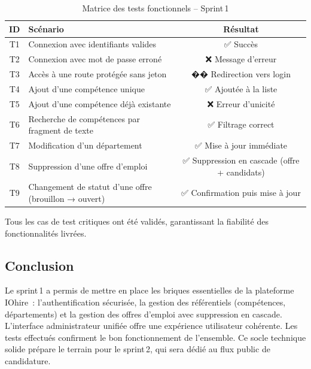 \documentclass[12pt,a4paper,oneside]{report}
\begin{document}
\begin{itemize}
\begin{table}[H]
\centering
\caption{Matrice des tests fonctionnels – Sprint 1}
\label{tab:tests-sprint1}
\begin{tabular}{|c|p{8cm}|c|}
\hline
\textbf{ID} & \textbf{Scénario} & \textbf{Résultat} \\ \hline
T1 & Connexion avec identifiants valides & ✅ Succès \\ \hline
T2 & Connexion avec mot de passe erroné & ❌ Message d’erreur \\ \hline
T3 & Accès à une route protégée sans jeton & �� Redirection vers login \\ \hline
T4 & Ajout d’une compétence unique & ✅ Ajoutée à la liste \\ \hline
T5 & Ajout d’une compétence déjà existante & ❌ Erreur d’unicité \\ \hline
T6 & Recherche de compétences par fragment de texte & ✅ Filtrage correct \\ \hline
T7 & Modification d’un département & ✅ Mise à jour immédiate \\ \hline
T8 & Suppression d’une offre d’emploi & ✅ Suppression en cascade (offre + candidats) \\ \hline
T9 & Changement de statut d’une offre (brouillon → ouvert) & ✅ Confirmation puis mise à jour \\ \hline
\end{tabular}
\end{table}

Tous les cas de test critiques ont été validés, garantissant la fiabilité des fonctionnalités livrées.

\subsection*{Conclusion }

Le sprint 1 a permis de mettre en place les briques essentielles de la plateforme IOhire~: l’authentification sécurisée, la gestion des référentiels (compétences, départements) et la gestion des offres d’emploi avec suppression en cascade. L’interface administrateur unifiée offre une expérience utilisateur cohérente. Les tests effectués confirment le bon fonctionnement de l’ensemble. Ce socle technique solide prépare le terrain pour le sprint 2, qui sera dédié au flux public de candidature.







\end{itemize}
\end{document}
